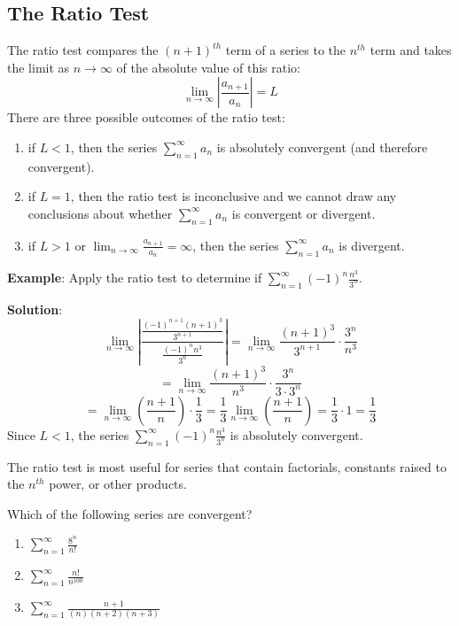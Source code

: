 \subsection{The Ratio Test}
The ratio test compares the $(n + 1)^{th}$ term of a series to the $n^{th}$ term 
and takes the limit as $n \to \infty$ of the absolute value of this ratio:
$$\lim_{n \to \infty} \left| \frac{a_{n + 1}}{a_n} \right| = L$$
There are three possible outcomes of the ratio test:
\begin{enumerate}
\item if $L < 1$, then the series $\sum_{n=1}^\infty a_n$ is absolutely 
convergent (and therefore convergent).
\item if $L = 1$, then the ratio test is inconclusive and we cannot draw any 
conclusions about whether $\sum_{n=1}^\infty a_n$ is convergent or divergent.
\item if $L > 1$ or $\lim_{n \to \infty} \frac{a_{n + 1}}{a_n} = \infty$, then 
the series $\sum_{n=1}^\infty a_n$ is divergent.
\end{enumerate}

\textbf{Example}: Apply the ratio test to determine if $\sum_{n=1}^\infty 
(-1)^n \frac{n^3}{3^n}$.

\textbf{Solution}: 
$$\lim_{n \to \infty} \left| \frac{\frac{(-1)^{n + 1}(n + 1)^3}{3^{n + 1}}}{
\frac{(-1)^n n^3}{3^n}} \right| = \lim_{n \to \infty} \frac{(n + 1)^3}{3^{n + 
1}} \cdot \frac{3^n}{n^3}$$
$$= \lim_{n \to \infty} \frac{(n + 1)^3}{n^3} \cdot \frac{3^n}{3 \cdot 3^n}$$
$$= \lim_{n \to \infty} \left( \frac{n + 1}{n} \right) \cdot \frac{1}{3} = 
\frac{1}{3} \lim_{n \to \infty} \left( \frac{n + 1}{n} \right) = \frac{1}{3} 
\cdot 1 = \frac{1}{3} $$
Since $L < 1$, the series $\sum_{n=1}^\infty (-1)^n \frac{n^3}{3^n}$ is 
absolutely convergent. 

The ratio test is most useful for series that contain factorials, constants 
raised to the $n^{th}$ power, or other products. 

\begin{Exercise} Which of the following series are 
convergent?
\begin{enumerate}
\item $\sum_{n=1}^\infty \frac{8^n}{n!}$
\item $\sum_{n=1}^\infty \frac{n!}{n^{100}}$
\item $\sum_{n=1}^\infty \frac{n + 1}{(n)(n+2)(n+3)}$
\end{enumerate}
\end{Exercise}

